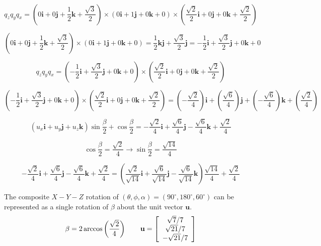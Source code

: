 \documentclass[11pt]{article}
\begin{document}
\begin{spacing}{1.2}
\

$$q_z q_y q_x 
=  
\left(0 \mathbf{i} + 0\mathbf{j} + \frac{1}{2}\mathbf{k} + \frac{\sqrt3}{2}\right)
\times
\left(0 \mathbf{i} + 1\mathbf{j} + 0\mathbf{k} + 0\right)
\times
\left(\frac{\sqrt2}{2}\mathbf{i} + 0\mathbf{j} + 0\mathbf{k}  + \frac{\sqrt2}{2}\right)
$$

$$\left(0 \mathbf{i} + 0\mathbf{j} + \frac{1}{2}\mathbf{k} + \frac{\sqrt3}{2}\right)
\times
\left(0 \mathbf{i} + 1\mathbf{j} + 0\mathbf{k} + 0\right)
 = \frac{1}{2} \mathbf{kj} + \frac{\sqrt3}{2}\mathbf{j}
 = -\frac{1}{2} \mathbf{i} + \frac{\sqrt3}{2}\mathbf{j} + 0 \mathbf{k} + 0
 $$

$$q_z q_y q_x 
=  
\left(-\frac{1}{2} \mathbf{i} + \frac{\sqrt3}{2}\mathbf{j} + 0 \mathbf{k} + 0\right)
\times
\left(\frac{\sqrt2}{2}\mathbf{i} + 0\mathbf{j} + 0\mathbf{k}  + \frac{\sqrt2}{2}\right)
$$

$$
\left(-\frac{1}{2} \mathbf{i} + \frac{\sqrt3}{2}\mathbf{j} + 0 \mathbf{k} + 0\right)
\times
\left(\frac{\sqrt2}{2}\mathbf{i} + 0\mathbf{j} + 0\mathbf{k}  + \frac{\sqrt2}{2}\right)
= \left( -\frac{\sqrt2}{4}\right)\mathbf{i}
+ \left( \frac{\sqrt6}{4}  \right) \mathbf{j}
+ \left(- \frac{\sqrt6}{4} \right) \mathbf{k}
+ \left( \frac{\sqrt2}{4}\right)
$$

$$
\left(u_x \mathbf{i} + u_y \mathbf{j} + u_z \mathbf{k} \right) \sin \frac{\beta}{2} + \cos \frac{\beta}{2} = 
-\frac{\sqrt2}{4}\mathbf{i}
+ \frac{\sqrt6}{4}\mathbf{j}
- \frac{\sqrt6}{4}\mathbf{k}
+ \frac{\sqrt2}{4}
$$

$$\cos \frac{\beta}{2} = \frac{\sqrt2}{4} \to \sin \frac{\beta}{2} = \frac{\sqrt{14}}{4}$$

$$
-\frac{\sqrt2}{4}\mathbf{i}
+ \frac{\sqrt6}{4}\mathbf{j}
- \frac{\sqrt6}{4}\mathbf{k}
+ \frac{\sqrt2}{4} = 
\left(
	\frac{\sqrt2}{\sqrt{14}} \mathbf{i} + 
	\frac{\sqrt6}{\sqrt{14}} \mathbf{j} -
	\frac{\sqrt6}{\sqrt{14}} \mathbf{k}
\right)
\frac{\sqrt{14}}{4} + \frac{\sqrt2}{4}
$$

The composite $X-Y-Z$ rotation of $(\theta,\phi,\alpha) = (90^{\circ}, 180^{\circ}, 60^{\circ})$ can be represented as a single rotation of $\beta$ about the unit vector $\mathbf{u}$. 
$$\beta = 2 \arccos\left( \frac{\sqrt2}{4} \right)
\qquad
\mathbf{u} = 
\left[
\begin{array}{c}
	\sqrt7/7 \cr
	\sqrt{21}/7\cr
	-\sqrt{21}/7 \cr
\end{array}
\right]
$$


\end{spacing}
\end{document}
